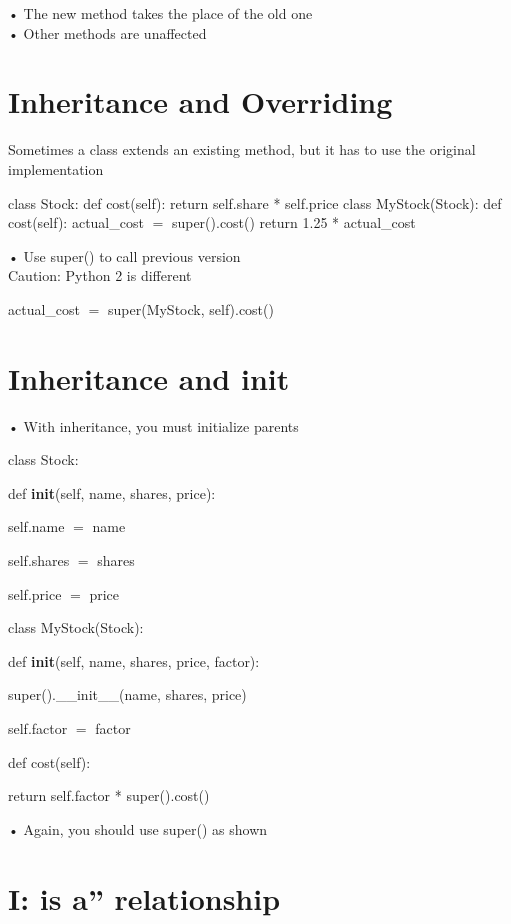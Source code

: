 \documentclass[
  letterpaper,
  DIV=11,
  numbers=noendperiod]{scrreprt}
\begin{document}
• The new method takes the place of the old one\\
• Other methods are unaffected


\chapter{Inheritance and Overriding}\label{inheritance-and-overriding}

Sometimes a class extends an existing method, but it has to use the
original implementation

class Stock: def cost(self): return self.share * self.price class
MyStock(Stock): def cost(self): actual\_cost \(=\) super().cost() return
1.25 * actual\_cost

• Use super() to call previous version\\
Caution: Python 2 is different

actual\_cost \(=\) super(MyStock, self).cost()


\chapter{Inheritance and init}\label{inheritance-and-init}

• With inheritance, you must initialize parents

class Stock:

def \textbf{init}(self, name, shares, price):

self.name \(=\) name

self.shares \(=\) shares

self.price \(=\) price

class MyStock(Stock):

def \textbf{init}(self, name, shares, price, factor):

super().\_\_init\_\_(name, shares, price)

self.factor \(=\) factor

def cost(self):

return self.factor * super().cost()

• Again, you should use super() as shown


\chapter{I: is a'' relationship}\label{i-is-a-relationship}
\end{document}
